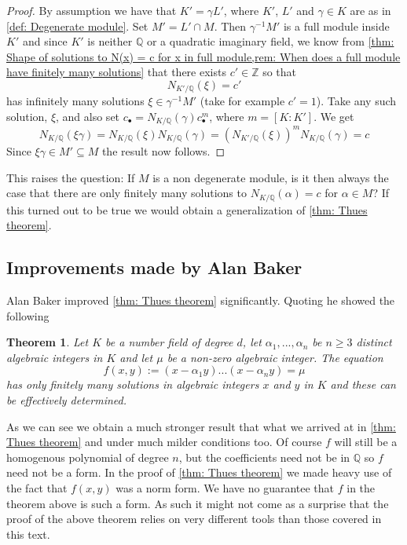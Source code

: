 \documentclass{article}
\newtheorem{theorem}{Theorem}[section]
\newcommand{\mbb}[1]{\mathbb{#1}}
\begin{document}
\begin{proof}
    By assumption we have that $K' = \gamma L'$, where $K'$, $L'$ and $\gamma \in K$ are as in \cref{def: Degenerate module}. Set $M' = L' \cap M$. Then $\gamma^{-1}M'$ is a full module inside $K'$ and since $K'$ is neither $\mbb Q$ or a quadratic imaginary field, we know from \cref{thm: Shape of solutions to N(x) = c for x in full module,rem: When does a full module have finitely many solutions} that there exists $c' \in \mbb Z$ so that 
    $$N_{K' / \mbb Q}(\xi) = c'$$ 
    has infinitely many solutions $\xi \in \gamma^{-1}M'$ (take for example $c' = 1$). Take any such solution, $\xi$, and also set $c_\bullet = N_{K / \mbb Q}(\gamma)c_\bullet^m$, where $m = [K : K']$. We get
    $$N_{K / \mbb Q}(\xi \gamma) = N_{K / \mbb Q}(\xi) N_{K / \mbb Q}(\gamma) = (N_{K' / \mbb Q}(\xi))^m N_{K / \mbb Q}(\gamma) = c$$  
    Since $\xi\gamma \in M' \subseteq M$ the result now follows.
\end{proof}
This raises the question: If $M$ is a non degenerate module, is it then always the case that there are only finitely many solutions to $N_{K/\mbb Q}(\alpha) = c$
for $\alpha \in M$? If this turned out to be true we would obtain a generalization of \cref{thm: Thues theorem}.

\subsection*{Improvements made by Alan Baker}
Alan Baker improved \cref{thm: Thues theorem} significantly. Quoting \citep[Theorem 4.1]{baker} he showed the following
\begin{theorem}
    Let $K$ be a number field of degree $d$, let $\alpha_1, ..., \alpha_n$ be $n \geq 3$ distinct algebraic integers in $K$ and let $\mu$ be a non-zero algebraic integer. The equation
    $$f(x, y) := (x - \alpha_1 y) ... (x - \alpha_n y) = \mu$$
    has only finitely many solutions in algebraic integers $x$ and $y$ in $K$ and these can be effectively determined.  
\end{theorem}
As we can see we obtain a much stronger result that what we arrived at in \cref{thm: Thues theorem} and under much milder conditions too. Of course $f$ will still be a homogenous polynomial of degree $n$, but the coefficients need not be in $\mbb Q$ so $f$ need not be a form. In the proof of \cref{thm: Thues theorem} we made heavy use of the fact that $f(x, y)$ was a norm form. We have no guarantee that $f$ in the theorem above is such a form. As such it might not come as a surprise that the proof of the above theorem relies on very different tools than those covered in this text. 
\end{document}
